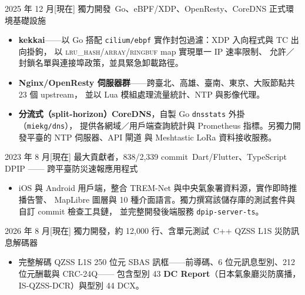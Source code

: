 \documentclass[zh]{resume}
\begin{document}
\begin{projects}
  \project%
    {2025 年 12 月}[現在]%
    {獨力開發}%
    {\,Go、eBPF/XDP、OpenResty、CoreDNS}%
    {正式環境基礎設施}%
    {\begin{itemize}
      \item \textbf{kekkai}——以 Go 搭配 \texttt{cilium/ebpf} 實作封包過濾：XDP 入向程式與 TC 出向掛鉤，
        以 \textsc{lru\_hash}/\textsc{array}/\textsc{ringbuf} map 實現單一 IP 速率限制、
        允許／封鎖名單與連接埠政策，並具緊急卸載路徑。
      \item \textbf{Nginx/OpenResty 伺服器群}——跨臺北、高雄、臺南、東京、大阪節點共 23 個 upstream，
        並以 Lua 模組處理流量統計、NTP 與影像代理。
      \item \textbf{分流式（split-horizon）CoreDNS}，自製 Go \texttt{dnsstats} 外掛（\texttt{miekg/dns}），
        提供各網域／用戶端查詢統計與 Prometheus 指標。另獨力開發平臺的 NTP 伺服器、API 閘道
        與 Meshtastic LoRa 資料接收服務。
    \end{itemize}}

  \project%
    {2023 年 8 月}[現在]%
    {最大貢獻者，838/2,339 commit}%
    {\,Dart/Flutter、TypeScript}%
    {DPIP —— 跨平臺防災速報應用程式}%
    {\begin{itemize}
      \item iOS 與 Android 用戶端，整合 TREM-Net 與中央氣象署資料源，實作即時推播告警、
        MapLibre 圖層與 10 種介面語言。獨力撰寫該儲存庫的測試套件與自訂 commit 檢查工具鏈，
        並完整開發後端服務 \texttt{dpip-server-ts}。
    \end{itemize}}

  \project%
    {2026 年 8 月}[現在]%
    {獨力開發，約 12,000 行、含單元測試}%
    {\,C++}%
    {QZSS L1S 災防訊息解碼器}%
    {\begin{itemize}
      \item 完整解碼 QZSS L1S 250 位元 SBAS 訊框——前導碼、6 位元訊息型別、212 位元酬載與 CRC-24Q——
        包含型別 43 \textbf{DC Report}（日本氣象廳災防廣播，IS-QZSS-DCR）與型別 44 DCX。
    \end{itemize}}
\end{projects}
\end{document}
